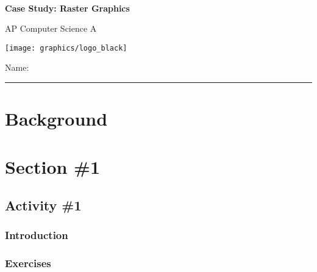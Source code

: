 

\def\CaseStudyCourse{AP Computer Science A}
\def\CaseStudyNumber{01}
\def\CaseStudyTitle{Raster Graphics}


	\begin{coverpages}
		\ \\[2cm]
		\begin{center}
			\huge
			\textbf{Case Study: \CaseStudyTitle}

			\Large
			\CaseStudyCourse
		\end{center}

		\vspace{1.5cm}

		\begin{center}
			\texttt{[image: graphics/logo\_black]}

			\vspace{2.5cm}

			\Large
			Name: \rule{11.5cm}{0.1pt}
		\end{center}
	\end{coverpages}

	\blankpage

	\thispagestyle{empty}
	\tableofcontents

	\pagebreak

  \section{Background}

  \pagebreak

  \section{Section \#1} %
    \subsection{Activity \#1}
      \subsubsection{Introduction}
      \subsubsection{Exercises}

